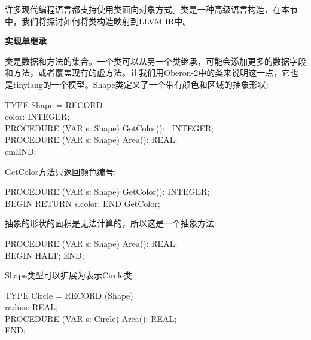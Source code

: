 许多现代编程语言都支持使用类面向对象方式。类是一种高级语言构造，在本节中，我们将探讨如何将类构造映射到LLVM IR中。\par

\hspace*{\fill} \par %
\textbf{实现单继承}

类是数据和方法的集合。一个类可以从另一个类继承，可能会添加更多的数据字段和方法，或者覆盖现有的虚方法。让我们用Oberon-2中的类来说明这一点，它也是tinylang的一个模型。Shape类定义了一个带有颜色和区域的抽象形状:\par

\begin{tcolorbox}[colback=white,colframe=black]
TYPE Shape = RECORD \\
\hspace*{3cm}color: INTEGER; \\
\hspace*{3cm}PROCEDURE (VAR s: Shape) GetColor(): \
\hspace*{3.5cm}INTEGER; \\
\hspace*{3cm}PROCEDURE (VAR s: Shape) Area(): REAL;\\
\hspace*{2.5cm}cmEND;
\end{tcolorbox}

GetColor方法只返回颜色编号:\par

\begin{tcolorbox}[colback=white,colframe=black]
PROCEDURE (VAR s: Shape) GetColor(): INTEGER; \\
BEGIN RETURN s.color; END GetColor;
\end{tcolorbox}

抽象的形状的面积是无法计算的，所以这是一个抽象方法:\par

\begin{tcolorbox}[colback=white,colframe=black]
PROCEDURE (VAR s: Shape) Area(): REAL; \\
BEGIN HALT; END;
\end{tcolorbox}

Shape类型可以扩展为表示Circle类:\par

\begin{tcolorbox}[colback=white,colframe=black]
TYPE Circle = RECORD (Shape) \\
\hspace*{3cm}radius: REAL; \\
\hspace*{3cm}PROCEDURE (VAR s: Circle) Area(): REAL; \\
\hspace*{2.5cm}END;
\end{tcolorbox}

